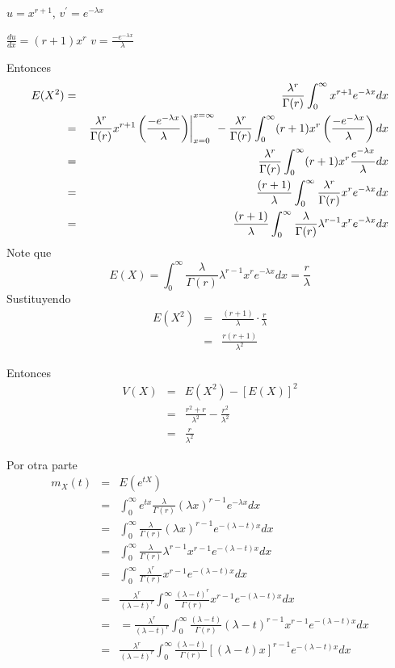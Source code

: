 \begin{i}
$u=x^{r+1}$,  $v^{\prime }=e^{-\lambda x}$

$\frac{du}{dx}=(r+1)x^{r}$  $v=\frac{-e^{-\lambda x}}{\lambda}$

Entonces
\begin{eqnarray*}
E(X^{2}) &=&\frac{\lambda ^{r}}{\Gamma (r)}\int_{0}^{\infty
}x^{r+1}e^{-\lambda x}dx \\
&=&\left. \frac{\lambda ^{r}}{\Gamma (r)}x^{r+1}\left( \frac{-e^{-\lambda x}%
}{\lambda }\right) \right\vert _{x=0}^{x=\infty }-\frac{\lambda ^{r}}{\Gamma
(r)}\int_{0}^{\infty }(r+1)x^{r}\left( \frac{-e^{-\lambda x}}{\lambda }%
\right) dx \\
&=&\frac{\lambda ^{r}}{\Gamma (r)}\int_{0}^{\infty }(r+1)x^{r}\frac{%
e^{-\lambda x}}{\lambda }dx \\
&=&\frac{(r+1)}{\lambda }\int_{0}^{\infty }\frac{\lambda ^{r}}{\Gamma (r)}%
x^{r}e^{-\lambda x}dx \\
&=&\frac{(r+1)}{\lambda }\int_{0}^{\infty }\frac{\lambda }{\Gamma (r)}%
\lambda ^{r-1}x^{r}e^{-\lambda x}dx
\end{eqnarray*}
Note que 
\begin{equation*}
E(X)=\int_{0}^{\infty }\frac{\lambda }{\Gamma (r)}\lambda
^{r-1}x^{r}e^{-\lambda x}dx=\frac{r}{\lambda }
\end{equation*}
Sustituyendo%
\begin{eqnarray*}
E(X^{2}) &=&\frac{(r+1)}{\lambda }\cdot \frac{r}{\lambda } \\
&=&\frac{r(r+1)}{\lambda ^{2}}
\end{eqnarray*}

Entonces
\begin{eqnarray*}
V(X) &=&E(X^{2})-\left[ E(X)\right] ^{2} \\
&=&\frac{r^{2}+r}{\lambda ^{2}}-\frac{r^{2}}{\lambda ^{2}}\text{ } \\
&=&\frac{r}{\lambda ^{2}}
\end{eqnarray*}

Por otra parte 
\begin{eqnarray*}
m_{X}(t) &=&E(e^{tX}) \\
&=&\int_{0}^{\infty }e^{tx}\frac{\lambda }{\Gamma (r)}\left( \lambda
x\right) ^{r-1}e^{-\lambda x}dx \\
&=&\int_{0}^{\infty }\frac{\lambda }{\Gamma (r)}(\lambda
x)^{r-1}e^{-(\lambda -t)x}dx \\
&=&\int_{0}^{\infty }\frac{\lambda }{\Gamma (r)}\lambda
^{r-1}x^{r-1}e^{-(\lambda -t)x}dx \\
&=&\int_{0}^{\infty }\frac{\lambda ^{r}}{\Gamma (r)}x^{r-1}e^{-(\lambda
-t)x}dx \\
&=&\frac{\lambda ^{r}}{(\lambda -t)^{r}}\int_{0}^{\infty }\frac{(\lambda
-t)^{r}}{\Gamma (r)}x^{r-1}e^{-(\lambda -t)x}dx \\
&=&=\frac{\lambda ^{r}}{(\lambda -t)^{r}}\int_{0}^{\infty }\frac{(\lambda -t)%
}{\Gamma (r)}(\lambda -t)^{r-1}x^{r-1}e^{-(\lambda -t)x}dx \\
&=&\frac{\lambda ^{r}}{(\lambda -t)^{r}}\int_{0}^{\infty }\frac{(\lambda -t)%
}{\Gamma (r)}\left[ (\lambda -t)x\right] ^{r-1}e^{-(\lambda -t)x}dx\text{ }
\end{eqnarray*}


\end{i}
